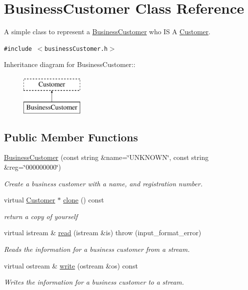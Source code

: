 \hypertarget{classBusinessCustomer}{
\section{BusinessCustomer Class Reference}
\label{classBusinessCustomer}
}
A simple class to represent a \hyperlink{classBusinessCustomer}{BusinessCustomer} who IS A \hyperlink{classCustomer}{Customer}.  


{\tt \#include $<$businessCustomer.h$>$}

Inheritance diagram for BusinessCustomer::\begin{figure}[H]
\begin{center}
\leavevmode
\includegraphics[height=2cm]{classBusinessCustomer}
\end{center}
\end{figure}
\subsection*{Public Member Functions}
\begin{CompactItemize}
\item 
\hyperlink{classBusinessCustomer_c8a0dcdb32d7a866c7383824889bfbae}{BusinessCustomer} (const string \&name=\char`\"{}UNKNOWN\char`\"{}, const string \&reg=\char`\"{}000000000\char`\"{})
\begin{CompactList}\small\item\em Create a business customer with a name, and registration number. \item\end{CompactList}\item 
virtual \hyperlink{classCustomer}{Customer} $\ast$ \hyperlink{classBusinessCustomer_6aaf68c4c9f64ed6cbb24855664d7244}{clone} () const 
\begin{CompactList}\small\item\em return a copy of yourself \item\end{CompactList}\item 
virtual istream \& \hyperlink{classBusinessCustomer_2c5cee8ad65d72e620a32f10e99b823d}{read} (istream \&is)  throw (input\_\-format\_\-error)
\begin{CompactList}\small\item\em Reads the information for a business customer from a stream. \item\end{CompactList}\item 
virtual ostream \& \hyperlink{classBusinessCustomer_2ea38f4b72488c8e9d7f7c38ed93b454}{write} (ostream \&os) const 
\begin{CompactList}\small\item\em Writes the information for a business customer to a stream. \item\end{CompactList}\end{CompactItemize}


